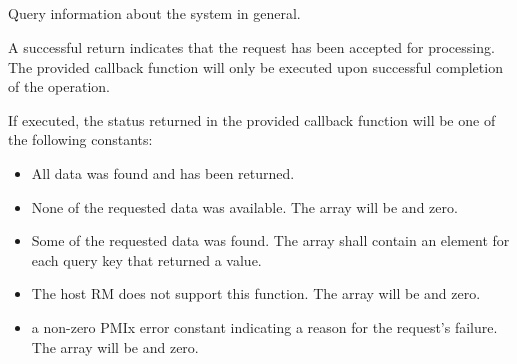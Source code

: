 \subsection{}

\summary

Query information about the system in general.

\format


\begin{arglist}
\end{arglist}

A successful return indicates that the request has been accepted for processing.
The provided callback function will only be executed upon successful completion of the operation.

\returnsimple

If executed, the status returned in the provided callback function will be one of the following constants:

\begin{itemize}
\item {} All data was found and has been returned.

\item {} None of the requested data was available.
The  array will be  and  zero.

\item {} Some of the requested data was found.
The  array shall contain an element for each query key that returned a value.

\item {} The host \ac{RM} does not support this function. The  array will be  and  zero.

\item a non-zero \ac{PMIx} error constant indicating a reason for the request's failure. The  array will be  and  zero.
\end{itemize}

